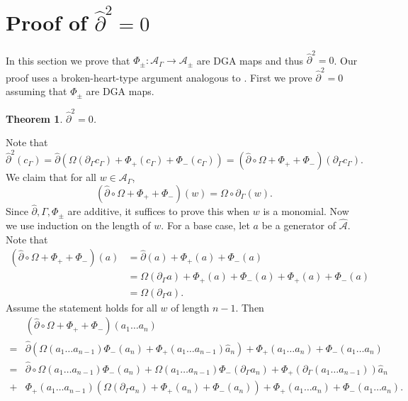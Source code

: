 \documentclass[11pt]{amsart}
\makeatletter
\renewenvironment{proof}[1][\proofname] {\par\pushQED{\qed}{\normalfont\bfseries\topsep6\p@\@plus6\p@\relax #1\@addpunct{.} }}{\popQED\endtrivlist\@endpefalse}
\theoremstyle{mystyle}
\newtheorem{theorem}[theorem]{Theorem}
\newcommand{\<}{\langle}
\renewcommand{\>}{\rangle}
\makeatother
\begin{document}
\section{Proof of $\widehat{\partial}^2=0$}\label{sec:d2 is 0}

In this section we prove that $\Phi_{\pm}: \mathcal{A}_\Gamma \rightarrow \mathcal{A}_\pm$ are DGA maps and thus $\widehat{\partial}^2 = 0$. Our proof uses a broken-heart-type argument analogous to \cite[Sec. 7]{chekanov2002dga}. First we prove $\widehat{\partial}^2 = 0$ assuming that $\Phi_\pm$ are DGA maps.

\begin{theorem} \it
	$\widehat{\partial}^2 = 0$.
\end{theorem}

\begin{proof}
	Note that \[\widehat{\partial}^2(c_\Gamma) = \widehat{\partial}(\Omega(\partial_\Gamma c_\Gamma) + \Phi_+(c_\Gamma) + \Phi_-(c_\Gamma)) = (\widehat{\partial} \circ \Omega + \Phi_+ + \Phi_-)(\partial_\Gamma c_\Gamma).\] We claim that for all $w \in \mathcal{A}_\Gamma$, \[(\widehat{\partial} \circ \Omega + \Phi_+ + \Phi_-)(w) = \Omega \circ \partial_\Gamma (w).\] Since $\widehat{\partial}, \Gamma, \Phi_\pm$ are additive, it suffices to prove this when $w$ is a monomial. Now we use induction on the length of $w$. For a base case, let $a$ be a generator of $\widehat{\mathcal{A}}$. Note that \begin{align*}
		(\widehat{\partial} \circ \Omega + \Phi_+ + \Phi_-)(a)
		&= \widehat{\partial}(a) + \Phi_+(a) + \Phi_-(a) \\
		&= \Omega(\partial_\Gamma a) + \Phi_+(a) + \Phi_-(a) + \Phi_+(a) + \Phi_-(a) \\
		&= \Omega(\partial_\Gamma a).
	\end{align*} Assume the statement holds for all $w$ of length $n-1$. Then \begin{align*}
		&(\widehat{\partial} \circ \Omega + \Phi_+ + \Phi_-)(a_1\dots a_n) \\
		=& \widehat{\partial}(\Omega(a_1\dots a_{n-1})\Phi_-(a_n) + \Phi_+(a_1\dots a_{n-1})\widehat{a}_n) + \Phi_+(a_1\dots a_n) + \Phi_-(a_1\dots a_n) \\
		=& \widehat{\partial} \circ \Omega(a_1\dots a_{n-1}) \Phi_-(a_n) + \Omega(a_1\dots a_{n-1})\Phi_-(\partial_\Gamma a_n) + \Phi_+(\partial_\Gamma(a_1\dots a_{n-1}))\widehat{a}_n \\
		+& \Phi_+(a_1\dots a_{n-1})(\Omega(\partial_\Gamma a_n) + \Phi_+(a_n) + \Phi_-(a_n)) + \Phi_+(a_1\dots a_n) + \Phi_-(a_1\dots a_n).

\end{align*}
\end{proof}
\end{document}
